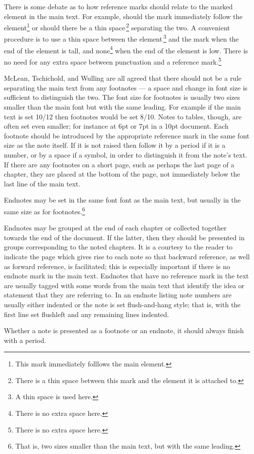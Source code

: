 \documentclass[10pt,a4paper,extrafontsizes]{memoir}
\begin{document}
\begin{paracol}{2}
    There is some debate as to how reference marks should relate to the 
marked element in the main text. For example, should the mark immediately 
follow the element\footnote{This mark immediately folllows the main element.} 
or should there be a thin space\,\footnote{There is a thin space between this
mark and the element it is attached to.} separating the two. A convenient 
procedure is to use a thin space between the 
element\,\footnote{A thin space is used here.} and the mark when the end of 
the element is tall, and 
none\footnote{There is no extra space here.} when the end of the element is 
low. There is no need for any extra space between punctuation and a reference
mark.\footnote{There is no extra space here.}

    McLean, Tschichold, and Wulling are all agreed that there should not be
a rule separating the main text from any footnotes --- a space and change in
font size is sufficient to distinguish the two. The font size for 
footnotes
is usually two sizes smaller than the main font but with the same 
leading. For example if the main text is set 10/12 then 
footnotes would be set 8/10. Notes to tables, though, are often set even 
smaller; for instance at 6pt or 7pt in a 10pt document. 
Each footnote should be introduced by the 
appropriate reference mark in the same font size as the note itself. If it is 
not raised then follow it by a period if it is a number, or by a space 
if a symbol, in order to distinguish it from the note's text. 
If there are any footnotes on a
short page, such as perhaps the last page of a chapter, they are placed
at the bottom of the page, not immediately below the last line of the main 
text.

   Endnotes may be set in the same font font as the main text, but usually in
the same size as for footnotes.\footnote{That is, two
sizes smaller than the main text, but with the same leading.} 

   Endnotes may be grouped at the end of each chapter or collected together
towards the end of the document. If the latter, then they should be presented
in groups corresponding to the noted chapters. It is a courtesy to the reader
to indicate the page which gives rise to each note so that backward reference,
as well as forward reference, is facilitated; this is especially important
if there is no endnote mark in the main text. Endnotes
that have no reference mark in the text are usually
tagged with some words from the main text that identify the idea or statement
that they are referring to.
   In an endnote listing note numbers are usually either indented or the note
is set flush-and-hang style; that is, with the 
first line set flushleft and any remaining lines indented.

Whether a note
is presented as a footnote or an endnote, it should always finish with a
period.
\end{paracol}
\end{document}
